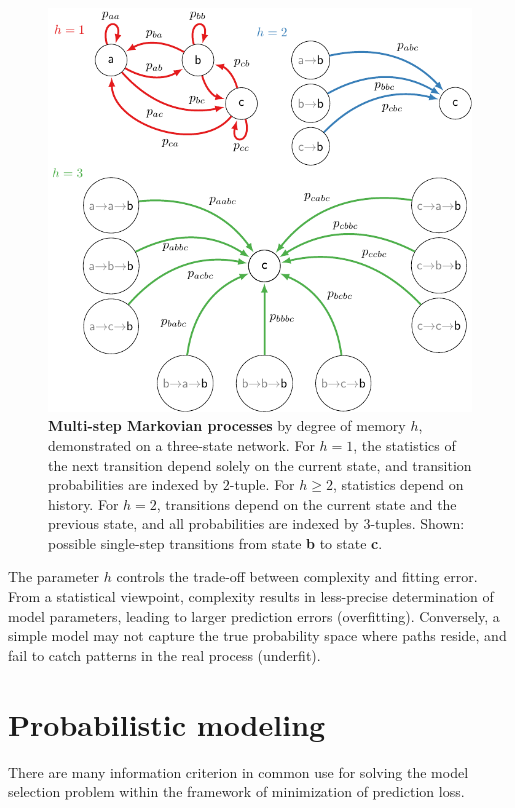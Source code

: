 \documentclass{IOS-Book-Article}
\renewcommand{\bf}[1]{\textbf{#1}}
\begin{document}
  \begin{figure}
 \includegraphics[width=\textwidth]{fig1a}
 \caption{\bf{Multi-step Markovian processes}  by degree of memory $h$, demonstrated on a three-state network. For $h=1$, the statistics of the next transition depend solely on the current state, and transition probabilities are indexed by  $2$-tuple. For $h\geq2$, statistics depend on history. For $h=2$, transitions depend on the
 current state and the previous state, and all probabilities are indexed by $3$-tuples.  Shown:  possible single-step transitions from state \bf{b} to state \bf{c}.  } \label{fig:fig1}
 \end{figure}

The parameter $h$ controls the trade-off between complexity and fitting error. From a statistical viewpoint, complexity results in less-precise determination of model parameters, leading to larger prediction errors (overfitting). Conversely, a simple model may not capture the true probability space where paths reside, and fail to catch patterns in the real process (underfit).

\section{Probabilistic modeling}

There are many information criterion in common use for solving the model selection problem within the framework of minimization of prediction loss.
\end{document}
